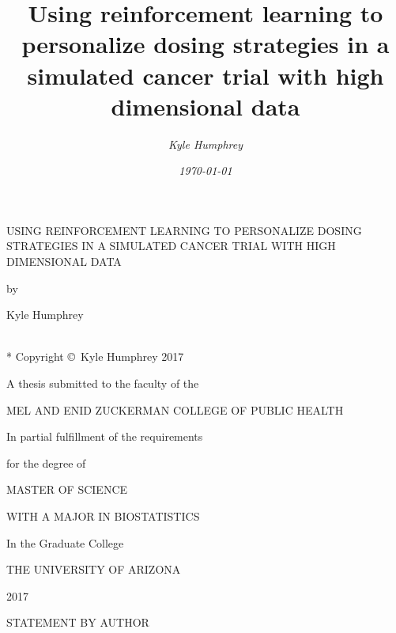 \documentclass[12pt]{article}
\title{\normalfont \Large Using reinforcement learning to personalize dosing strategies in a simulated cancer trial with high dimensional data}
\author{\normalsize \sl Kyle Humphrey}
\date{\normalsize \sl \today}
\begin{document}
\begin{titlepage}
    \begin{center}
        \vspace*{1cm}
        
        \uppercase{Using reinforcement learning to personalize dosing strategies in a simulated cancer trial with high dimensional data}
        
        \vfill
        
        by
        
        \vfill
        
        Kyle Humphrey
        
        \vfill
        
        \underline{\kern 3in} \\*
        Copyright \copyright~Kyle Humphrey 2017
        
        \vfill
        
        A thesis submitted to the faculty of the

        \vfill
        
        \uppercase{Mel and Enid Zuckerman College of Public Health}
        
        \vfill
        
        In partial fulfillment of the requirements
        
        \bigskip
        
        for the degree of
        
        \vfill
        
        \uppercase{Master of Science}
        
        \medskip
        
        \uppercase{With a major in Biostatistics}
        
        \vfill
        
        In the Graduate College 
        
        \vfill
        
        \uppercase{The University of Arizona}
        
        \vfill
        
        2017
        
    \end{center}
\end{titlepage}

\begin{center}
STATEMENT BY AUTHOR
\end{center}
\end{document}
